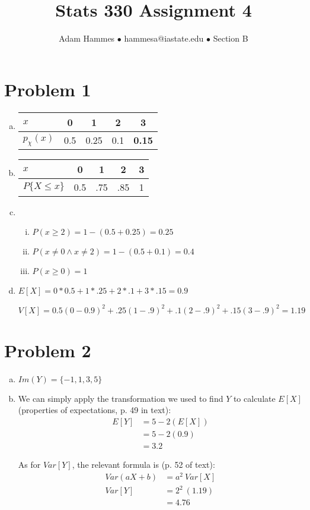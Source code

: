 \documentclass[11pt]{article}
\begin{document}
\title{Stats 330 Assignment 4}
\author{Adam Hammes $\bullet$ hammesa@iastate.edu $\bullet$ Section B}
\maketitle

\section*{Problem 1}
\begin{enumerate}[(a)]
	\item
	\begin{tabular}{l| c c c c|}
		$x$ & 0 & 1 & 2 & 3 \\
		\hline
		$p_{\chi}(x)$ & 0.5 & 0.25 & 0.1 & \textbf{0.15}\\
	\end{tabular}
	
	\item
	\begin{tabular}{l| c c c c|}
		$x$ & 0 & 1 & 2 & 3\\
		\hline
		$P\{X \leq x\}$ & 0.5 & .75 &.85 & 1\\
	\end{tabular}
	\item
	\begin{enumerate}[i.]
		\item $P ( x \ge 2) = 1 - (0.5 + 0.25  ) = 0.25$
	
		\item $P ( x \neq 0 \wedge x \neq 2 ) = 1 - (0.5 + 0.1 ) = 0.4$
	
		\item $P ( x \ge 0 ) = 1$
	\end{enumerate}
	\item	
	$E[X] = 0 * 0.5 + 1 * .25 + 2 * .1 + 3 * .15 = 0.9$
		
	$V[X] = 0.5(0 - 0.9)^2 + .25(1-.9)^2+ .1(2-.9)^2  + .15(3-.9)^2 = 1.19$

\end{enumerate}


\section*{Problem 2}
\begin{enumerate}[(a)]
	\item $Im(Y) = \{-1, 1, 3, 5\}$
	
	\item We can simply apply the transformation we used to find $Y$ to calculate $E[X]$ (properties of expectations, p. 49 in text):
		\begin{align*}
		E[Y] &= 5 - 2( E[X] ) \\
		&= 5 - 2( 0.9 ) \\
		&= 3.2
		\end{align*}
		
		As for $Var[Y]$, the relevant formula is (p. 52 of text):
		\begin{align*}
			Var(aX + b) &= a^2\ Var[X] \\
			Var[Y] &= 2^2\ (1.19) \\
			&= 4.76
		\end{align*}
\end{enumerate}
\end{document}
